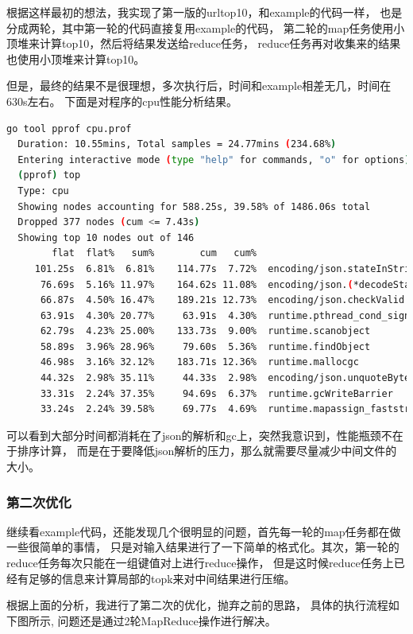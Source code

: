 \documentclass[UTF8]{ctexart}
\begin{document}
根据这样最初的想法，我实现了第一版的urltop10，和example的代码一样，
也是分成两轮，其中第一轮的代码直接复用example的代码，
第二轮的map任务使用小顶堆来计算top10，然后将结果发送给reduce任务，
reduce任务再对收集来的结果也使用小顶堆来计算top10。

但是，最终的结果不是很理想，多次执行后，时间和example相差无几，时间在630s左右。
下面是对程序的cpu性能分析结果。
\begin{lstlisting}[language=bash]
  go tool pprof cpu.prof                                                                                                      Time: Oct 4, 2019 at 5:01pm (CST)
  Duration: 10.55mins, Total samples = 24.77mins (234.68%)
  Entering interactive mode (type "help" for commands, "o" for options)
  (pprof) top
  Type: cpu
  Showing nodes accounting for 588.25s, 39.58% of 1486.06s total
  Dropped 377 nodes (cum <= 7.43s)
  Showing top 10 nodes out of 146
        flat  flat%   sum%        cum   cum%
     101.25s  6.81%  6.81%    114.77s  7.72%  encoding/json.stateInString
      76.69s  5.16% 11.97%    164.62s 11.08%  encoding/json.(*decodeState).scanWhile
      66.87s  4.50% 16.47%    189.21s 12.73%  encoding/json.checkValid
      63.91s  4.30% 20.77%     63.91s  4.30%  runtime.pthread_cond_signal
      62.79s  4.23% 25.00%    133.73s  9.00%  runtime.scanobject
      58.89s  3.96% 28.96%     79.60s  5.36%  runtime.findObject
      46.98s  3.16% 32.12%    183.71s 12.36%  runtime.mallocgc
      44.32s  2.98% 35.11%     44.33s  2.98%  encoding/json.unquoteBytes
      33.31s  2.24% 37.35%     94.69s  6.37%  runtime.gcWriteBarrier
      33.24s  2.24% 39.58%     69.77s  4.69%  runtime.mapassign_faststr
\end{lstlisting}

可以看到大部分时间都消耗在了json的解析和gc上，突然我意识到，性能瓶颈不在于排序计算，
而是在于要降低json解析的压力，那么就需要尽量减少中间文件的大小。

\subsubsection{第二次优化}

继续看example代码，还能发现几个很明显的问题，首先每一轮的map任务都在做一些很简单的事情，
只是对输入结果进行了一下简单的格式化。其次，第一轮的reduce任务每次只能在一组键值对上进行reduce操作，
但是这时候reduce任务上已经有足够的信息来计算局部的topk来对中间结果进行压缩。

根据上面的分析，我进行了第二次的优化，抛弃之前的思路，
具体的执行流程如下图所示, 问题还是通过2轮MapReduce操作进行解决。
\end{document}
